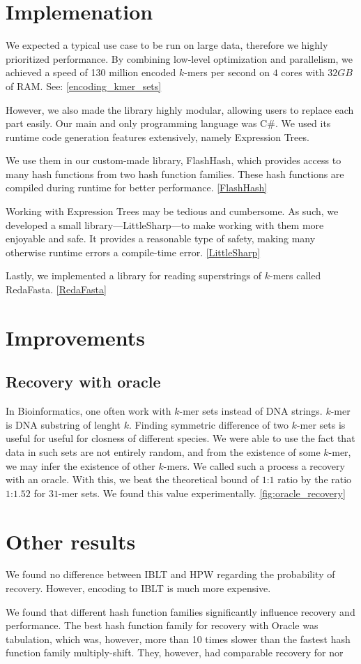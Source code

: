 \section*{Implemenation}
We expected a typical use case to be run on large data, therefore we highly prioritized performance. By combining low-level optimization and parallelism, we achieved a speed of 130 million encoded $k$-mers per second on $4$ cores with $32GB$ of RAM.  See: \ref{encoding_kmer_sets}

However, we also made the library highly modular, allowing users to replace each part easily. Our main and only programming language was C\#. We used its runtime code generation features extensively, namely Expression Trees. 

We use them in our custom-made library, FlashHash, which provides access to many hash functions from two hash function families. These hash functions are compiled during runtime for better performance. \ref{FlashHash}

Working with Expression Trees may be tedious and cumbersome. As such, we developed a small library—LittleSharp—to make working with them more enjoyable and safe. It provides a reasonable type of safety, making many otherwise runtime errors a compile-time error. \ref{LittleSharp}

Lastly, we implemented a library for reading superstrings of $k$-mers called RedaFasta.  \ref{RedaFasta}

\section*{Improvements}

\subsection*{Recovery with oracle}
In Bioinformatics, one often work with $k$-mer sets instead of DNA strings. $k$-mer is DNA substring of lenght $k$. Finding symmetric difference of two $k$-mer sets is useful for useful for closness of different species. 
We were able to use the fact that data in such sets are not entirely random, and from the existence of some $k$-mer, we may infer the existence of other $k$-mers. We called such a process a recovery with 
an oracle. With this, we beat the theoretical bound of $1$:$1$ ratio by the ratio $1$:$1.52$ for $31$-mer sets. We found this value experimentally.
 \ref{fig:oracle_recovery}


\section*{Other results}
We found no difference between IBLT and HPW regarding the probability of recovery. However, encoding to IBLT is much more expensive. 

We found that different hash function families significantly influence recovery and performance. The best hash function family for recovery with Oracle was tabulation,  which was, however, more than 10 times slower than the fastest hash function family multiply-shift. They, however, had comparable recovery for nor